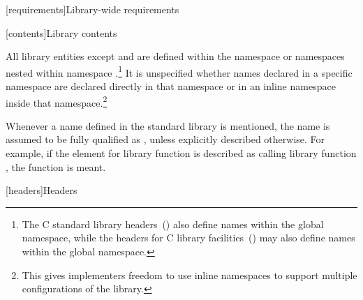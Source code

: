 [requirements]{Library-wide requirements}

\setcounter{subsection}{1}
[contents]{Library contents}


\setcounter{Paras}{1}

\pnum
All library entities except
and
are defined within the namespace
 
or namespaces nested within namespace
 .\footnote{The C standard library headers~() also define
names within the global namespace, while the \Cpp{} headers for C library
facilities~() may also define names within the global namespace.}%
It is unspecified whether names declared in a specific namespace are declared
directly in that namespace or in an inline namespace inside that
namespace.\footnote{This gives implementers freedom to use inline namespaces to
support multiple configurations of the library.}

\pnum
Whenever a name  defined in the standard library is mentioned,
the name  is assumed to be fully qualified as
, 
unless explicitly described otherwise. For example, if the \effects element
for library function  is described as calling library function 
,
the function
is meant.

[headers]{Headers}


